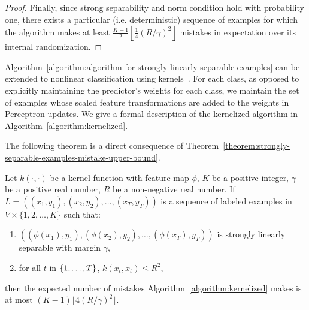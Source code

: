 \begin{proof}


Finally, since strong separability and norm condition hold with probability one,
there exists a particular (i.e. deterministic) sequence of examples for which
the algorithm makes at least $\frac{K-1}2 \left\lfloor \frac 1 4 (R/\gamma)^2
\right\rfloor$ mistakes in expectation over its internal randomization.
\end{proof}

Algorithm~\ref{algorithm:algorithm-for-strongly-linearly-separable-examples} can
be extended to nonlinear classification using
kernels~\cite{Scholkopf-Smola-2002, Shawe-Taylor-Cristianini-2004}. For each
class, as opposed to explicitly maintaining the predictor's weights for each
class, we maintain the set of examples whose scaled feature transformations are
added to the weights in Perceptron updates. We give a formal description of the
kernelized algorithm in Algorithm~\ref{algorithm:kernelized}.

The following theorem is a direct consequence of Theorem~\ref{theorem:strongly-separable-examples-mistake-upper-bound}.

\begin{theorem}
\label{theorem:kernelized-upper-bound}
Let $k(\cdot, \cdot)$ be a kernel function with feature map $\phi$, $K$ be a positive
integer, $\gamma$ be a positive real number, $R$ be a non-negative real number. If
$L = ((x_1, y_1), (x_2, y_2), \dots, (x_T, y_T))$ is a sequence of labeled examples in
$V \times \{1,2,\dots,K\}$ such that:
\begin{enumerate}
  \item $((\phi(x_1), y_1), (\phi(x_2), y_2), \dots, (\phi(x_T), y_T))$ is strongly linearly separable with margin $\gamma$,
  \item for all $t$ in $\cbr{1,\ldots,T}$, $k(x_t,x_t) \le R^2$,
\end{enumerate}
then the
expected number of mistakes
Algorithm~\ref{algorithm:kernelized}
makes is at most $(K-1) \lfloor 4(R/\gamma)^2 \rfloor$.
\end{theorem}

